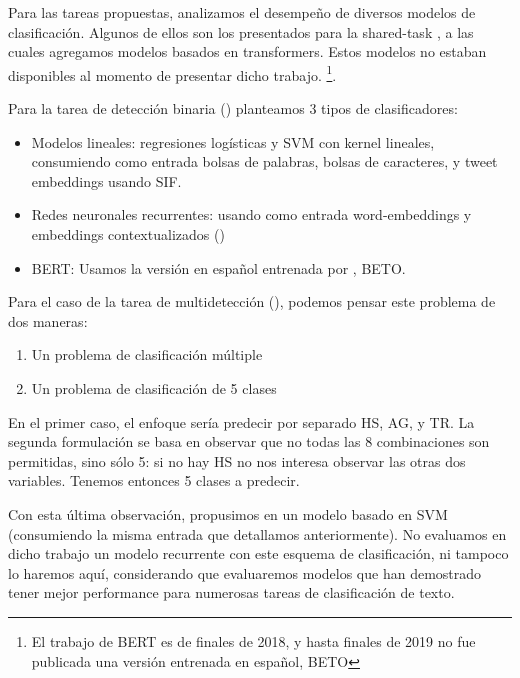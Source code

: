 Para las tareas propuestas, analizamos el desempeño de diversos modelos de clasificación. Algunos de ellos son los presentados para la shared-task \hateval{}, a las cuales agregamos modelos basados en transformers. Estos modelos no estaban disponibles al momento de presentar dicho trabajo. \footnote{El trabajo de BERT\cite{devlin2018bert} es de finales de 2018, y hasta finales de 2019 no fue publicada una versión entrenada en español, BETO}.

Para la tarea de detección binaria (\subtaska{}) planteamos 3 tipos de clasificadores:

\begin{itemize}
    \item Modelos lineales: regresiones logísticas y SVM con kernel lineales, consumiendo como entrada bolsas de palabras, bolsas de caracteres, y tweet embeddings usando SIF.
    \item Redes neuronales recurrentes: usando como entrada word-embeddings y embeddings contextualizados (\elmo{})
    \item BERT: Usamos la versión en español entrenada por \citet{canete2020spanish}, BETO.
\end{itemize}

Para el caso de la tarea de multidetección (\subtaskb{}), podemos pensar este problema de dos maneras:

\begin{enumerate}
    \item Un problema de clasificación múltiple
    \item Un problema de clasificación de 5 clases
\end{enumerate}

En el primer caso, el enfoque sería predecir por separado HS, AG, y TR. La segunda formulación se basa en observar que no todas las 8 combinaciones son permitidas, sino sólo 5: si no hay HS no nos interesa observar las otras dos variables. Tenemos entonces 5 clases a predecir.

Con esta última observación, propusimos en \citet{atalaya_tass2018} un modelo basado en SVM (consumiendo la misma entrada que detallamos anteriormente). No evaluamos en dicho trabajo un modelo recurrente con este esquema de clasificación, ni tampoco lo haremos aquí, considerando que evaluaremos modelos que han demostrado tener mejor performance para numerosas tareas de clasificación de texto.

